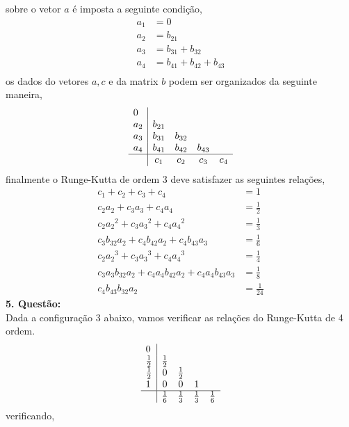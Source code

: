 \documentclass[a4paper,12pt]{article}
\begin{document}
sobre o vetor $a$ \'e imposta a seguinte condi\c c\~ao,
\begin{align*}
	a_1 &= 0\\
	a_2 &= b_{21}\\
	a_3 &= b_{31} + b_{32}\\
	a_4 &= b_{41} + b_{42} + b_{43}\\
\end{align*}
os dados do vetores $a, c$ e da matrix $b$ podem ser organizados da seguinte maneira,
{\arraycolsep=3.4pt\def\arraystretch{1.4}
\[
	\begin{array}{l|cccc} 
		0 &  & & \\
		a_2 & b_{21} & & & \\
		a_3 & b_{31} & b_{32}& &\\
		a_4 & b_{41} & b_{42}&b_{43} &\\
		\hline
		&c_1 & c_2 & c_3 & c_4
	\end{array}
\]
}
finalmente o Runge-Kutta de ordem 3 deve satisfazer as seguintes rela\c c\~oes,
\begin{align*}
	c_1 + c_2 + c_3 + c_4 &= 1 \\
	c_2 a_2 + c_3 a_3  + c_4 a_4&= \frac{1}{2} \\
	c_2 {a_2}^{2} + c_3 {a_3}^{2} + c_4 {a_4}^{2}&= \frac{1}{3} \\
	c_3 b_{32} a_2 + c_4 b_{42}a_2  + c_4 b_{43} a_3 &= \frac{1}{6}\\
	c_2 {a_2}^{3} + c_3 {a_3}^{3} + c_4 {a_4}^{3}&= \frac{1}{4} \\
	c_3 a_3 b_{32} a_2 + c_4 a_4 b_{42}a_2  + c_4 a_4 b_{43} a_3 &= \frac{1}{8}\\
	c_4 b_{43} b_{32} a_2 &= \frac{1}{24}
\end{align*}
\textbf{5. Quest\~ao:}\\
Dada a configura\c c\~ao 3 abaixo, vamos verificar as rela\c c\~oes do Runge-Kutta de 4 ordem.
{\arraycolsep=3.4pt\def\arraystretch{1.4}
\[
	\begin{array}{l|cccc} 
		0 &  & & \\
		\frac{1}{2} & \frac{1}{2} & & & \\
		\frac{1}{2} & 0 & \frac{1}{2}& &\\
		1 & 0 & 0 & 1 &\\
		\hline
		&\frac{1}{6} & \frac{1}{3} & \frac{1}{3} & \frac{1}{6}
	\end{array}
\]
}
verificando,
\end{document}
